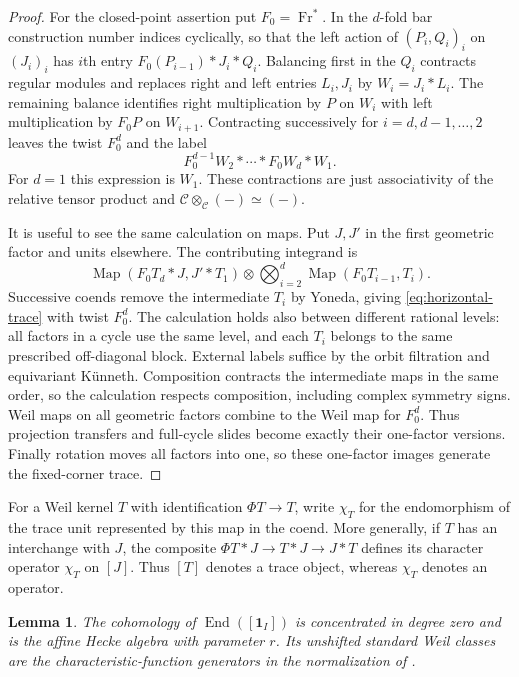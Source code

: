 \documentclass[11pt]{article}
\numberwithin{equation}{section}
\newtheorem{lemma}[theorem]{Lemma}
\theoremstyle{definition}
\theoremstyle{remark}
\newcommand{\Fr}{\operatorname{Fr}}
\newcommand{\Map}{\operatorname{Map}}
\newcommand{\End}{\operatorname{End}}
\begin{document}
\begin{proof}
For the closed-point assertion put $F_0=\Fr^*$.  In the $d$-fold bar
construction number indices cyclically, so that the left action of
$(P_i,Q_i)_i$ on $(J_i)_i$ has $i$th entry
$F_0(P_{i-1})*J_i*Q_i$.  Balancing first in the $Q_i$ contracts regular
modules and replaces right and left entries $L_i,J_i$ by
$W_i=J_i*L_i$.  The remaining balance identifies right multiplication
by $P$ on $W_i$ with left multiplication by $F_0P$ on $W_{i+1}$.
Contracting successively for $i=d,d-1,\ldots,2$ leaves the twist
$F_0^d$ and the label
\[
 F_0^{d-1}W_2*\cdots*F_0W_d*W_1.
\]
For $d=1$ this expression is $W_1$.  These contractions are just
associativity of the relative tensor product and
$\mathscr C\otimes_{\mathscr C}(-)\simeq(-)$.

It is useful to see the same calculation on maps.  Put $J,J'$ in the
first geometric factor and units elsewhere.  The contributing
integrand is
\[
 \Map(F_0T_d*J,J'*T_1)
 \otimes\bigotimes_{i=2}^d\Map(F_0T_{i-1},T_i).
\]
Successive coends remove the intermediate $T_i$ by Yoneda, giving
\eqref{eq:horizontal-trace} with twist $F_0^d$.  The calculation holds
also between different rational levels: all factors in a cycle use the
same level, and each $T_i$ belongs to the same prescribed off-diagonal
block.  External labels suffice by the orbit filtration and equivariant
K\"unneth.  Composition contracts the intermediate maps in the same
order, so the calculation respects composition, including complex
symmetry signs.  Weil maps on all geometric factors combine to the
Weil map for $F_0^d$.  Thus projection transfers and full-cycle slides
become exactly their one-factor versions.  Finally rotation moves all
factors into one, so these one-factor images generate the fixed-corner
trace.
\end{proof}

For a Weil kernel $T$ with identification $\Phi T\to T$, write
$\chi_T$ for the endomorphism of the trace unit represented by this
map in the coend.  More generally, if $T$ has an interchange with
$J$, the composite $\Phi T*J\to T*J\to J*T$ defines its character
operator $\chi_T$ on $[J]$.  Thus $[T]$ denotes a trace object,
whereas $\chi_T$ denotes an operator.

\begin{lemma}\label{trace:hecke-algebra}
The cohomology of $\End([\mathbf1_I])$ is concentrated in degree zero
and is the affine Hecke algebra with parameter $r$.  Its unshifted
standard Weil classes are the characteristic-function generators in
the normalization of \cite[Proposition~2.6, ``Hecke action and transfer'']{Parent}.
\end{lemma}
\end{document}
